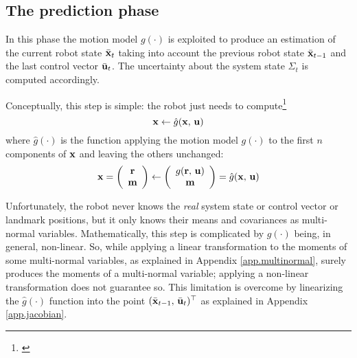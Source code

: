 \subsection{The prediction phase}
	In this phase the motion model $g(\cdot)$ is exploited to produce an estimation of the current robot state $\bar{\boldsymbol{\mathrm{{x}}}}_t$ taking into account the previous robot state $\bar{\boldsymbol{\mathrm{{x}}}}_{t-1}$ and the last control vector $\bar{\boldsymbol{\mathrm{{u}}}}_t$.
	The uncertainty about the system state $\Sigma_t$ is computed accordingly.
	
	Conceptually, this step is simple: the robot just needs to compute\footnote{\label{sec.ekf.alert}\notationAlert}
	\[
		\boldsymbol{\mathrm{{x}}} \leftarrow \hat{g}(\boldsymbol{\mathrm{{x}}},\, \boldsymbol{\mathrm{{u}}})
	\]
	where $\hat{g}(\cdot)$ is the function applying the motion model $g(\cdot)$ to the first $n$ components of $\boldsymbol{\mathrm{{x}}}$ and leaving the others unchanged:
	\[
		\boldsymbol{\mathrm{{x}}} = 
		\left(\begin{array}{c}
			\boldsymbol{\mathrm{{r}}} \\ \boldsymbol{\mathrm{{m}}}
		\end{array}\right)
		\leftarrow
		\left(\begin{array}{c}
			g(\boldsymbol{\mathrm{{r}}},\, \boldsymbol{\mathrm{{u}}}) \\ \boldsymbol{\mathrm{{m}}}
		\end{array}\right) 
		= \hat{g}(\boldsymbol{\mathrm{{x}}},\, \boldsymbol{\mathrm{{u}}})
	\]
	
	Unfortunately, the robot never knows the \emph{real} system state or control vector or landmark positions, but it only knows their means and covariances as multi-normal variables.
	Mathematically, this step is complicated by $g(\cdot)$ being, in general, non-linear.
	So, while applying a linear transformation to the moments of some multi-normal variables, as explained in Appendix \ref{app.multinormal}, surely produces the moments of a multi-normal variable; applying a non-linear transformation does not guarantee so.
	This limitation is overcome by linearizing the $\hat{g}(\cdot)$ function into the point $(\bar{\boldsymbol{\mathrm{{x}}}}_{t-1},\, \bar{\boldsymbol{\mathrm{{u}}}}_{t})^\top$ as explained in Appendix \ref{app.jacobian}.
	
